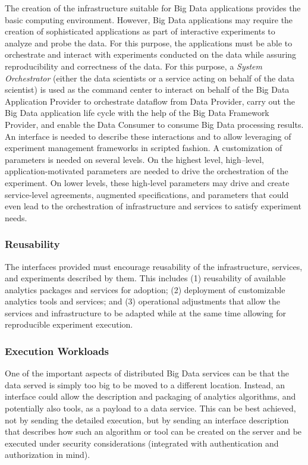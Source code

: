 \documentclass[9pt,]{article}
\begin{document}
The creation of the infrastructure suitable for Big Data applications
provides the basic computing environment. However, Big Data applications
may require the creation of sophisticated applications as part of
interactive experiments to analyze and probe the data. For this purpose,
the applications must be able to orchestrate and interact with
experiments conducted on the data while assuring reproducibility and
correctness of the data. For this purpose, a \emph{System Orchestrator}
(either the data scientists or a service acting on behalf of the data
scientist) is used as the command center to interact on behalf of the
Big Data Application Provider to orchestrate dataflow from Data
Provider, carry out the Big Data application life cycle with the help of
the Big Data Framework Provider, and enable the Data Consumer to consume
Big Data processing results. An interface is needed to describe these
interactions and to allow leveraging of experiment management frameworks
in scripted fashion. A customization of parameters is needed on several
levels. On the highest level, high--level, application-motivated
parameters are needed to drive the orchestration of the experiment. On
lower levels, these high-level parameters may drive and create
service-level agreements, augmented specifications, and parameters that
could even lead to the orchestration of infrastructure and services to
satisfy experiment needs.

\hypertarget{reusability}{%
\subsubsection{Reusability}\label{reusability}}

The interfaces provided must encourage reusability of the
infrastructure, services, and experiments described by them. This
includes (1) reusability of available analytics packages and services
for adoption; (2) deployment of customizable analytics tools and
services; and (3) operational adjustments that allow the services and
infrastructure to be adapted while at the same time allowing for
reproducible experiment execution.

\hypertarget{execution-workloads}{%
\subsubsection{Execution Workloads}\label{execution-workloads}}

One of the important aspects of distributed Big Data services can be
that the data served is simply too big to be moved to a different
location. Instead, an interface could allow the description and
packaging of analytics algorithms, and potentially also tools, as a
payload to a data service. This can be best achieved, not by sending the
detailed execution, but by sending an interface description that
describes how such an algorithm or tool can be created on the server and
be executed under security considerations (integrated with
authentication and authorization in mind).
\end{document}
